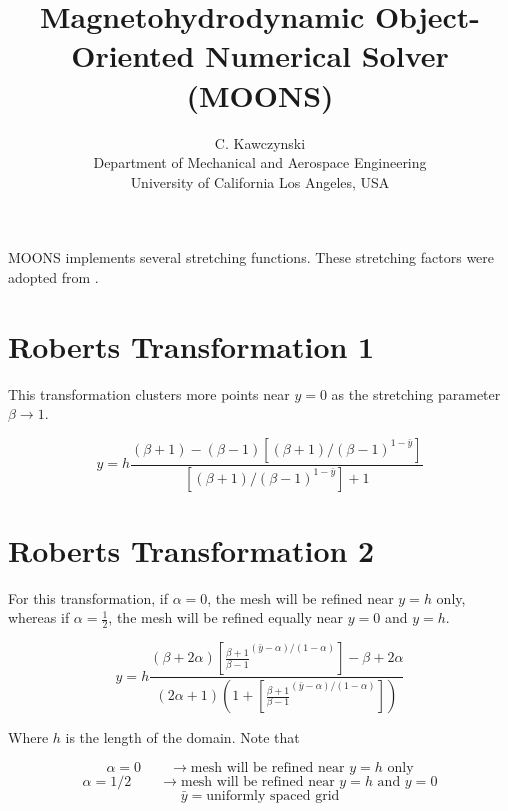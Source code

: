 \documentclass[11pt]{article}
\begin{document}
\doublespacing
\title{Magnetohydrodynamic Object-Oriented Numerical Solver (MOONS)}
\author{C. Kawczynski \\
Department of Mechanical and Aerospace Engineering \\
University of California Los Angeles, USA\\
}
\maketitle

MOONS implements several stretching functions. These stretching factors were adopted from \cite{pletcher2012computational}.

\section{Roberts Transformation 1}

This transformation clusters more points near $y=0$ as the stretching parameter $\beta \rightarrow 1$.

\begin{equation}
	y
	=
	h
	\frac{(\beta+1)-(\beta-1) \left[ (\beta+1)/(\beta-1)^{1-\bar{y}} \right] }
	{\left[ (\beta+1)/(\beta-1)^{1-\bar{y}} \right]+1}
\end{equation}

\section{Roberts Transformation 2}
For this transformation, if $\alpha=0$, the mesh will be refined near $y=h$ only, whereas if $\alpha= \frac{1}{2}$, the mesh will be refined equally near $y=0$ and $y=h$.

\begin{equation}
	y 
	= 
	h 
	\frac{
	(\beta + 2 \alpha)
	\left[ \frac{\beta+1}{\beta-1}^{(\bar{y}-\alpha)/(1-\alpha)} \right] - \beta + 2 \alpha}
	{
	(2\alpha+1)
	\left(1+\left[ \frac{\beta+1}{\beta-1}^{(\bar{y}-\alpha)/(1-\alpha)} \right]
	\right)
	}
\end{equation}

Where $h$ is the length of the domain. Note that

\begin{equation}
	\alpha = 0 \qquad \rightarrow \text{mesh will be refined near $y=h$ only}
\end{equation}
\begin{equation}
	\alpha = 1/2 \qquad \rightarrow \text{mesh will be refined near $y=h$ and $y=0$}
\end{equation}
\begin{equation}
	\bar{y} = \text{uniformly spaced grid}
\end{equation}
\end{document}
